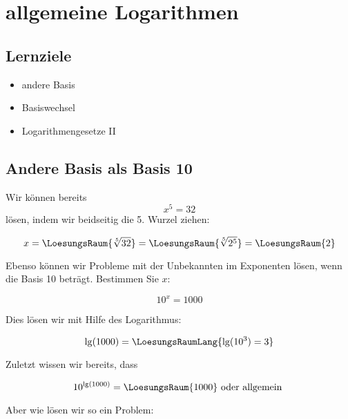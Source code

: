 
\section{allgemeine Logarithmen}
\subsection*{Lernziele}

\begin{itemize}
 \item andere Basis
 \item Basiswechsel
 \item Logarithmengesetze II
\end{itemize}


\newpage

\subsection{Andere Basis als Basis 10}

Wir können bereits $$x^5=32$$ lösen, indem wir beidseitig die
5. Wurzel ziehen:

$$x = \LoesungsRaum{\sqrt[5]{32}} = \LoesungsRaum{\sqrt[5]{2^5}} = \LoesungsRaum{2}$$

Ebenso können wir Probleme mit der Unbekannten im Exponenten lösen,
wenn die Basis 10 beträgt. Bestimmen Sie $x$:

$$10^x = 1000$$

Dies lösen wir mit Hilfe des Logarithmus:

$$\lg(1000) = \LoesungsRaumLang{\lg(10^3) = 3}$$

Zuletzt wissen wir bereits, dass

$$10^{\lg(1000)} = \LoesungsRaum{1000} \text{ oder allgemein }$$

\begin{center}
\end{center}

\newpage


Aber wie lösen wir so ein Problem:

